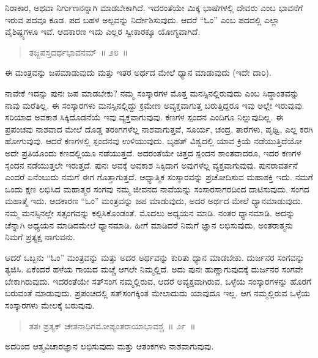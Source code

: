 ನಿರಾಕಾರ, ಅಥವಾ ನಿರ್ಗುಣನನ್ನಾಗಿ ಮಾಡಬೇಕಾಗಿದೆ. ಇದರಂತೆಯೇ ಮಿಕ್ಕ ಭಾಷೆಗಳಲ್ಲಿ ದೇವರು ಎಂಬ ಭಾವನೆಗೆ ಇರುವ ಪದವೂ ಕೂಡ. ಪದ ಬಹಳ ಅಲ್ಪವನ್ನು ನಿರ್ದೇಶಿಸುವುದು. ಆದರೆ “ಓಂ” ಎಂಬ ಪದದಲ್ಲಿ ಎಲ್ಲಾ ವೈಶಿಷ್ಟ್ಯಗಳೂ ಇವೆ. ಆದಕಾರಣ ಇದು ಎಲ್ಲರ ಸ್ವೀಕಾರಕ್ಕೂ ಯೋಗ್ಯವಾಗಿದೆ.

\begin{verse}
ತಜ್ಜಪಸ್ತದರ್ಥಭಾವನಮ್​~॥ ೨೮~॥
\end{verse}

\vspace{-0.3cm}

ಈ ಮಂತ್ರವನ್ನು ಜಪಮಾಡುವುದು ಮತ್ತು ಇತರ ಅರ್ಥದ ಮೇಲೆ ಧ್ಯಾನ ಮಾಡುವುದು (ಇದೇ ದಾರಿ). 

ನಾವೇಕೆ ಇದನ್ನು ಪುನಃ ಜಪ ಮಾಡಬೇಕು? ನಮ್ಮ ಸಂಸ್ಕಾರಗಳ ಮೊತ್ತ ಮನಸ್ಸಿನಲ್ಲಿರುವುದು ಎಂಬ ಸಿದ್ಧಾಂತವನ್ನು ನಾವು ಮರೆತಿಲ್ಲ. ಈ ಸಂಸ್ಕಾರಗಳು ಮನಸ್ಸಿನಲ್ಲಿದ್ದು ಕ್ರಮೇಣ ಅವ್ಯಕ್ತವಾಗುತ್ತ ಬರುತ್ತಿದ್ದರೂ ಇವು ಅಲ್ಲೇ ಇರುವುವು. ಸರಿಯಾದ ಅವಕಾಶ ಸಿಕ್ಕಿದೊಡನೆಯೆ ಇವು ವ್ಯಕ್ತವಾಗುವುವು. ಕಣಗಳ ಸ್ಪಂದನ ಎಂದಿಗೂ ನಿಲ್ಲುವುದಿಲ್ಲ. ಈ ಪ್ರಪಂಚವು ನಾಶವಾದ ಮೇಲೆ ದೊಡ್ಡ ತರಂಗಗಳೆಲ್ಲ ನಾಶವಾಗುತ್ತವೆ, ಸೂರ್ಯ, ಚಂದ್ರ, ತಾರೆಗಳು, ಪೃಥ್ವಿ, ಎಲ್ಲ ಕರಗಿ ಹೋಗುವುವು. ಆದರೆ ಕಣಗಳಲ್ಲಿ ಸ್ಪಂದನವು ಉಳಿಯುವುದು. ಬೃಹತ್​ ವಿಶ್ವದಲ್ಲಿ ಯಾವ ಕ್ರಿಯೆ ನಡೆಯುತ್ತಿದೆಯೋ ಅದೇ ಪ್ರತಿಯೊಂದು ಕಣದಲ್ಲಿಯೂ ನಡೆಯುತ್ತದೆ. ಅದರಂತೆಯೇ ಚಿತ್ತದ ಸ್ಪಂದನ ಶಾಂತವಾದರೂ, ಇದರ ಕಣಗಳ ಸ್ಪಂದನ ನಡೆಯುತ್ತಲೇ ಇರುತ್ತದೆ. ಪುನಃ ಅವಕ್ಕೆ ಅವಕಾಶ ಸಿಕ್ಕಿದಾಗ ಅವುಗಳೆಲ್ಲ ವ್ಯಕ್ತವಾಗುವುವು. ಪುನರಾವರ್ತನೆ ಎಂದರೆ ಏನೆಂಬುದು ನಮಗೆ ಈಗ ಗೊತ್ತಾಗುತ್ತದೆ. ಆಧ್ಯಾತ್ಮಿಕ ಸಂಸ್ಕಾರವನ್ನು ಪ್ರಚೋದಿಸುವ ಮಹಾಶಕ್ತಿ ಇದು. ನಮಗೆ ಒಂದು ಕ್ಷಣ ಲಭಿಸಿದ ಮಹಾತ್ಮರ ಸಂಗವು ನಮ್ಮ ಜೀವನದ ನಾವೆಯನ್ನು ಸಂಸಾರಸಾಗರದಿಂದ ದಾಟಿಸುವುದು. ಸಂಗದ ಮಹಾತ್ಮೆ ಇದು. ಆದಕಾರಣ “ಓಂ” ಮಂತ್ರವನ್ನು ಜಪ ಮಾಡುವುದು, ಅದರ ಅರ್ಥದ ಮೇಲೆ ಧ್ಯಾನಮಾಡುವುದು. ನಮ್ಮ ಮನಸ್ಸಿನಲ್ಲೇ ಸತ್ಸಂಗವನ್ನು ಕಲ್ಪಿಸಿಕೊಂಡಂತೆ. ಮೊದಲು ಅಧ್ಯಯನ ಮಾಡಿ. ನಂತರ ಧ್ಯಾನಮಾಡಿ. ಅದನ್ನು ಚೆನ್ನಾಗಿ ಅಧ್ಯಯನ ಮಾಡಿದಮೇಲೆ ಧ್ಯಾನಮಾಡಿ. ಹೀಗೆ ಮಾಡಿದರೆ ನಿಮಗೆ ಜ್ಞಾನ ಲಭಿಸುವುದು, ಅಂತರಾತ್ಮನು ನಿಮಗೆ ಪ್ರತ್ಯಕ್ಷ ನಾಗುವನು. 

ಆದರೆ ಒಬ್ಬನು “ಓಂ” ಮಂತ್ರವನ್ನು ಮತ್ತು ಅದರ ಅರ್ಥವನ್ನು ಕುರಿತು ಧ್ಯಾನ ಮಾಡಬೇಕು. ದುರ್ಜನರ ಸಂಗವನ್ನು ತ್ಯಜಿಸಿ. ಏಕೆಂದರೆ ಹಳೆಯ ಗಾಯದ ಮಚ್ಚೆ ಆಗಲೇ ನಿಮ್ಮಲ್ಲಿದೆ. ಅದು ಪುನಃ ಹುಣ್ಣಾಗುವುದಕ್ಕೆ ದುರ್ಜನರ ಸಂಗವೇ ಬೇಕಾಗಿರುವುದು. ಇದರಂತೆಯೇ ಸತ್​ಸಂಗ ನಮ್ಮಲ್ಲಿರುವ, ಆದರೆ ಅವ್ಯಕ್ತವಾಗಿರುವ, ಒಳ್ಳೆಯ ಸಂಸ್ಕಾರಗಳನ್ನು ಹೊರಗೆ ಬರುವಂತೆ ಮಾಡುವುದು. ಪ್ರಪಂಚದಲ್ಲಿ ಸತ್​ಸಂಗಕ್ಕಿಂತ ಮೇಲಾದುದು ಯಾವುದೂ ಇಲ್ಲ. ಆಗ ನಮ್ಮಲ್ಲಿರುವ ಒಳ್ಳೆಯ ಸಂಸ್ಕಾರಗಳು ಮೇಲಕ್ಕೆ ಬರುವುವು. 

\vspace{-0.3cm}

\begin{verse}
ತತಃ ಪ್ರತ್ಯಕ್​ ಚೇತನಾಧಿಗಮೋಪ್ಯಂತರಾಯಾಭಾವಶ್ಚ~॥ ೨೯~॥
\end{verse}

\vspace{-0.3cm}

ಅದರಿಂದ ಆತ್ಮವಿಚಾರಜ್ಞಾನ ಲಭಿಸುವುದು ಮತ್ತು ಆತಂಕಗಳು ನಾಶವಾಗುವುವು. 

